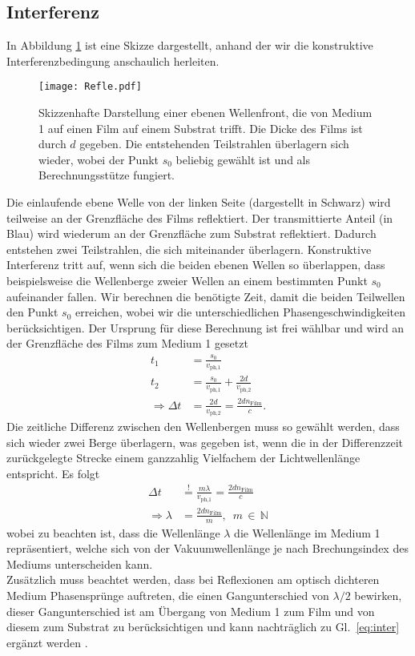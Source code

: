 \subsection{\label{subsec:FZV2}Interferenz}
In Abbildung \ref{fig:refle} ist eine Skizze dargestellt, anhand der wir die
konstruktive Interferenzbedingung anschaulich herleiten.
\begin{figure}[h!]
  \centering
  \texttt{[image: Refle.pdf]}
  \caption{\label{fig:refle}Skizzenhafte Darstellung einer ebenen Wellenfront,
    die von Medium 1 auf einen Film auf einem Substrat trifft. Die Dicke des Films ist
    durch $d$ gegeben. Die entstehenden Teilstrahlen überlagern sich wieder, wobei der
    Punkt $s_{0}$ beliebig gewählt ist und als Berechnungsstütze fungiert. }
\end{figure}\FloatBarrier
Die einlaufende ebene Welle von der linken Seite (dargestellt in Schwarz) wird teilweise
an der Grenzfläche des Films reflektiert.
Der transmittierte Anteil (in Blau) wird wiederum an der Grenzfläche zum Substrat reflektiert.
Dadurch entstehen zwei Teilstrahlen, die sich miteinander überlagern.
Konstruktive Interferenz tritt auf, wenn sich die beiden ebenen Wellen so überlappen,
dass beispielsweise die Wellenberge zweier Wellen an einem bestimmten Punkt $s_{0}$
aufeinander fallen. Wir berechnen die benötigte Zeit, damit die beiden Teilwellen den Punkt
$s_{0}$ erreichen, wobei wir die unterschiedlichen Phasengeschwindigkeiten berücksichtigen. \newpage
Der Ursprung für diese Berechnung ist frei wählbar und wird an der Grenzfläche des
Films zum Medium 1 gesetzt
\begin{align}
  t_{1}                & = \frac{s_{0}}{v_{\text{ph,}1}}                              \\
  t_{2}                & = \frac{s_{0}}{v_{\text{ph,}1}} + \frac{2d}{v_{\text{ph,}2}} \\
  \Rightarrow \Delta t & = \frac{2d}{v_{\text{ph,}2}} = \frac{2dn_{\text{Film}}}{c}.
\end{align}
Die zeitliche Differenz zwischen den Wellenbergen muss so gewählt werden, dass sich
wieder zwei Berge überlagern, was gegeben ist, wenn die in der Differenzzeit zurückgelegte
Strecke einem ganzzahlig Vielfachem der Lichtwellenlänge entspricht.
Es folgt
\begin{align}
  \Delta t            & \stackrel{!}{=} \frac{m\lambda}{v_{\text{ph,}1}} = \frac{2dn_{\text{Film}}}{c} \\
  \Rightarrow \lambda & = \frac{2dn_{\text{Film}}}{m}, \,\,\,m\,\in\,\mathbb{N}\label{eq:inter}
\end{align}
wobei zu beachten ist, dass die Wellenlänge $\lambda$ die Wellenlänge im Medium 1 repräsentiert,
welche sich von der Vakuumwellenlänge je nach Brechungsindex des Mediums unterscheiden kann. \\
Zusätzlich muss beachtet werden, dass bei Reflexionen am optisch dichteren Medium Phasensprünge auftreten,
die einen Gangunterschied von $\lambda / 2$ bewirken, dieser Gangunterschied ist am Übergang von
Medium 1 zum Film und von diesem zum Substrat zu berücksichtigen und kann
nachträglich zu Gl.~\eqref{eq:inter} ergänzt werden \cite{EPC,Gekle}. \\